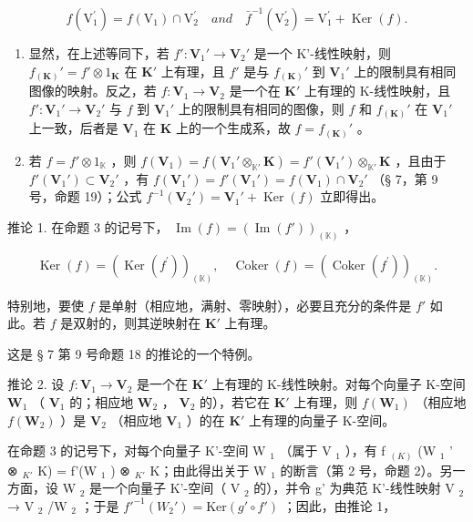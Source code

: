 \[
f (\mathrm{V} _ {1} ^ {\prime}) = f (\mathrm{V} _ {1}) \cap \mathrm{V} _ {2} ^ {\prime} \quad and \quad \bar {f} ^ {- 1} (\mathrm{V} _ {2} ^ {\prime}) = \mathrm{V} _ {1} ^ {\prime} + \operatorname{Ker} (f).
\]

\begin{enumerate}
\def\labelenumi{(\roman{enumi})}
\item
  显然，在上述等同下，若 \(f': \mathbf{V}_1' \to \mathbf{V}_2'\) 是一个 K'-线性映射，则 \(f_{(\mathbf{K})}' = f' \otimes 1_{\mathbf{K}}\) 在 \(\mathbf{K}'\) 上有理，且 \(f'\) 是与 \(f_{(\mathbf{K})}'\) 到 \(\mathbf{V}_1'\) 上的限制具有相同图像的映射。反之，若 \(f: \mathbf{V}_1 \to \mathbf{V}_2\) 是一个在 \(\mathbf{K}'\) 上有理的 K-线性映射，且 \(f': \mathbf{V}_1' \to \mathbf{V}_2'\) 与 \(f\) 到 \(\mathbf{V}_1'\) 上的限制具有相同的图像，则 \(f\) 和 \(f_{(\mathbf{K})}'\) 在 \(\mathbf{V}_1'\) 上一致，后者是 \(\mathbf{V}_1\) 在 \(\mathbf{K}\) 上的一个生成系，故 \(f = f_{(\mathbf{K})}'\) 。
\item
  若 \(f = f' \otimes 1_{\mathbb{K}}\) ，则 \(f(\mathbf{V}_1) = f(\mathbf{V}_1' \otimes_{\mathbb{K}'} \mathbf{K}) = f'(\mathbf{V}_1') \otimes_{\mathbb{K}'} \mathbf{K}\) ，且由于 \(f'(\mathbf{V}_1') \subset \mathbf{V}_2'\) ，有 \(f(\mathbf{V}_1') = f'(\mathbf{V}_1') = f(\mathbf{V}_1) \cap \mathbf{V}_2'\) （§ 7，第 9 号，命题 19）；公式 \(f^{-1}(\mathbf{V}_2') = \mathbf{V}_1' + \operatorname{Ker}(f)\) 立即得出。
\end{enumerate}

推论 1. 在命题 3 的记号下， \(\operatorname{Im}(f) = (\operatorname{Im}(f'))_{(\mathbb{K})}\) ，

\[
\operatorname{Ker} (f) = (\operatorname{Ker} (f ^ {\prime})) _ {(\mathbb {K})}, \quad \operatorname{Coker} (f) = (\operatorname{Coker} (f ^ {\prime})) _ {(\mathbb {K})}.
\]

特别地，要使 \(f\) 是单射（相应地，满射、零映射），必要且充分的条件是 \(f'\) 如此。若 \(f\) 是双射的，则其逆映射在 \(\mathbf{K}'\) 上有理。

这是 § 7 第 9 号命题 18 的推论的一个特例。

推论 2. 设 \(f: \mathbf{V}_1 \to \mathbf{V}_2\) 是一个在 \(\mathbf{K}'\) 上有理的 K-线性映射。对每个向量子 K-空间 \(\mathbf{W}_1\) （ \(\mathbf{V}_1\) 的；相应地 \(\mathbf{W}_2\) ， \(\mathbf{V}_2\) 的），若它在 \(\mathbf{K}'\) 上有理，则 \(f(\mathbf{W}_1)\) （相应地 \(f(\mathbf{W}_2)\) ）是 \(\mathbf{V}_2\) （相应地 \(\mathbf{V}_1\) ）的在 \(\mathbf{K}'\) 上有理的向量子 K-空间。

在命题 3 的记号下，对每个向量子 K'-空间 W \(_{1}\) （属于 V \(_{1}\) ），有 f \(_{(K)}\) (W \(_{1}\) ' ⊗ \(_{K'}\) K) = f'(W \(_{1}\) ) ⊗ \(_{K'}\) K；由此得出关于 W \(_{1}\) 的断言（第 2 号，命题 2）。另一方面，设 W \(_{2}\) 是一个向量子 K'-空间（ V \(_{2}\) 的），并令 g' 为典范 K'-线性映射 V \(_{2}\) → V \(_{2}\) /W \(_{2}\) ；于是 \(f'^{-1}(W_{2}') = \text{Ker}(g' \circ f')\) ；因此，由推论 1，

